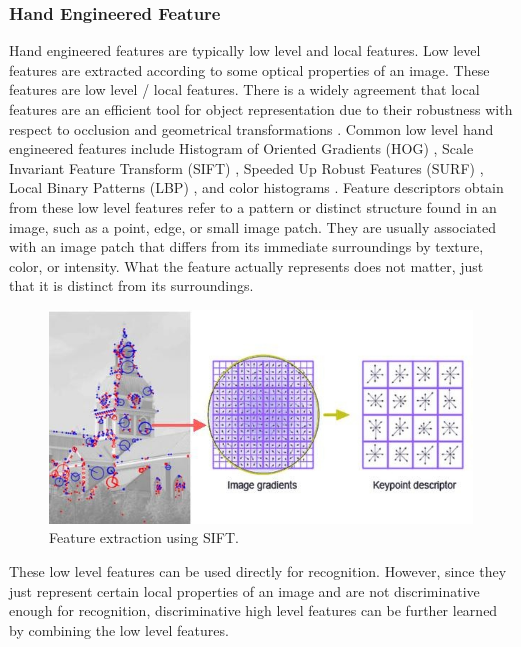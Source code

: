 \subsubsection{Hand Engineered Feature}
Hand engineered features are typically low level and local features.
Low level features are extracted according to some optical properties of an image. These features are low level / local features. There is a widely agreement that local features are an efficient tool for object representation due to their robustness with respect to occlusion and geometrical transformations \cite{van2006coloring}. Common low level hand engineered features include Histogram of Oriented Gradients (HOG) \cite{dalal2005histograms}, Scale Invariant Feature Transform (SIFT) \cite{lowe1999object}, Speeded Up Robust Features (SURF) \cite{bay2006surf}, Local Binary Patterns (LBP) \cite{ojala2002multiresolution}, and color histograms \cite{birchfield1998elliptical}. Feature descriptors obtain from these low level features refer to a pattern or distinct structure found in an image, such as a point, edge, or small image patch. They are usually associated with an image patch that differs from its immediate surroundings by texture, color, or intensity. What the feature actually represents does not matter, just that it is distinct from its surroundings.
\begin{figure}[h]
	\centering
	\includegraphics[scale=.6]{introduction/fig/sift.jpg}
	\caption{Feature extraction using SIFT.}\label{fig:intro:sift}
\end{figure}
These low level features can be used directly for recognition. However, since they just represent certain local properties of an image and are not discriminative enough for recognition, discriminative high level features can be further learned by combining the low level features. 

